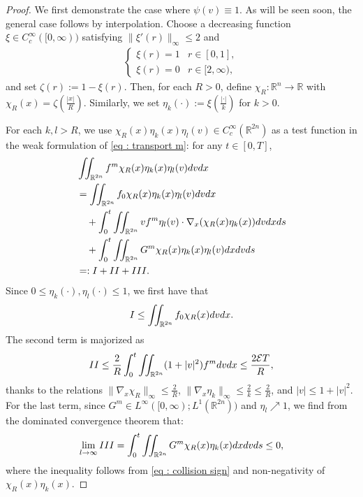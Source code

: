 \documentclass[10pt,a4paper]{amsart}
\newcommand{\R}{\mathbb{R}}
\newcommand{\calE}{\mathcal E}
\newcommand{\ds}{\textnormal{d}s}
\newcommand{\dv}{\textnormal{d}v}
\newcommand{\dx}{\textnormal{d}x}
\newcommand{\intr}{\int_{\R^n}}
\newcommand{\lt}{\left}
\newcommand{\rt}{\right}
\begin{document}
\begin{proof}
We first demonstrate the case where $\psi(v) \equiv 1$. As will be seen soon, the general case follows by interpolation.
Choose a decreasing function $\xi \in C_c^\infty([0,\infty))$ satisfying $\|\xi'(r)\|_\infty \le 2$ and
\begin{align*}
\begin{cases}
    \xi(r) = 1  &  r \in [0,1],\\
    \xi(r) = 0  &   r \in [2,\infty),
    \end{cases}
\end{align*}
and set $\zeta(r):= 1- \xi(r)$. Then, for each $R>0$, define $\chi_R:\R^n\to\R$ with $\chi_R(x) = \zeta\left(\frac{|x|}{R}\right)$. Similarly, we set $\eta_k(\cdot):= \xi\lt(\frac{|\cdot|}{k}\rt)$ for $k>0$.

For each $k,l>R$, we use $\chi_R(x)\eta_k(x)\eta_l(v) \in C_c^\infty(\R^{2n})$ as a test function in the weak formulation of \eqref{eq : transport m}: for any $t \in [0,T]$,
\begin{equation}\label{eq: form ftc}
\begin{split}
    &\iint_{\R^{2n}} f^m \chi_R(x)\eta_k(x)\eta_l(v)\dv\dx  \\
    &= \iint_{\R^{2n}} f_0 \chi_R(x)\eta_k(x)\eta_l(v)\dv\dx \\
    &\quad +  \int_0^t\iint_{\R^{2n}} v f^m \eta_l(v) \cdot \nabla_x (\chi_R(x)\eta_k(x)) \dv\dx \ds\\
    &\quad + \int_0^t\iint_{\R^{2n}} G^m  \chi_R(x)\eta_k(x) \eta_l(v)\dx\dv\ds \\
    &=: I + II + III.
\end{split}
\end{equation}
Since $0 \le \eta_k(\cdot), \eta_l(\cdot) \le 1$, we first have that
\[
I \le \iint_{\R^{2n}} f_0 \chi_R(x)\dv\dx .
\]
The second term is majorized as
\[
II \le \frac{2}{R}\int_0^t \iint_{\R^{2n}} (1+|v|^2)f^m \dv\dx \le \frac{2\calE T}{R},
\]
thanks to the relations $\|\nabla_x\chi_R\|_{\infty} \le \frac{2}{R}$, $\|\nabla_x\eta_k\|_\infty \le \frac{2}{k}\le \frac{2}{R}$, and $|v| \le 1 + |v|^2$. For the last term, since $G^m \in L^\infty([0,\infty);L^1(\R^{2n}))$ and $\eta_l \nearrow 1$, we find from the dominated convergence theorem that:
\[
\lim_{l \to \infty} III =  \int_0^t\iint_{\R^{2n}}  G^m \chi_R(x)\eta_k(x)\dx\dv\ds \le 0,
\]
where the inequality follows from  \eqref{eq : collision sign} and non-negativity of $\chi_R(x) \eta_k(x)$.


\end{proof}
\end{document}
